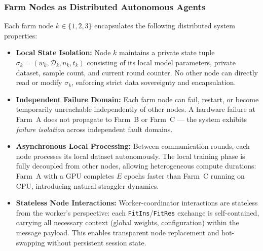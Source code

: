 \documentclass[applsci,article,submit,oneauthor,pdftex]{Definitions/mdpi}
\begin{document}
\subsubsection{Farm Nodes as Distributed Autonomous Agents}
Each farm node $k \in \{1, 2, 3\}$ encapsulates the following distributed system properties:
\begin{itemize}[leftmargin=*]
    \item \textbf{Local State Isolation:} Node $k$ maintains a private state tuple $\sigma_k = (w_k, \mathcal{D}_k, n_k, t_k)$ consisting of its local model parameters, private dataset, sample count, and current round counter. No other node can directly read or modify $\sigma_k$, enforcing strict data sovereignty and encapsulation.
    \item \textbf{Independent Failure Domain:} Each farm node can fail, restart, or become temporarily unreachable independently of other nodes. A hardware failure at Farm~A does not propagate to Farm~B or Farm~C --- the system exhibits \textit{failure isolation} across independent fault domains.
    \item \textbf{Asynchronous Local Processing:} Between communication rounds, each node processes its local dataset autonomously. The local training phase is fully decoupled from other nodes, allowing heterogeneous compute durations: Farm~A with a GPU completes $E$ epochs faster than Farm~C running on CPU, introducing natural straggler dynamics.
    \item \textbf{Stateless Node Interactions:} Worker-coordinator interactions are stateless from the worker's perspective: each \texttt{FitIns}/\texttt{FitRes} exchange is self-contained, carrying all necessary context (global weights, configuration) within the message payload. This enables transparent node replacement and hot-swapping without persistent session state.
\end{itemize}
\end{document}
